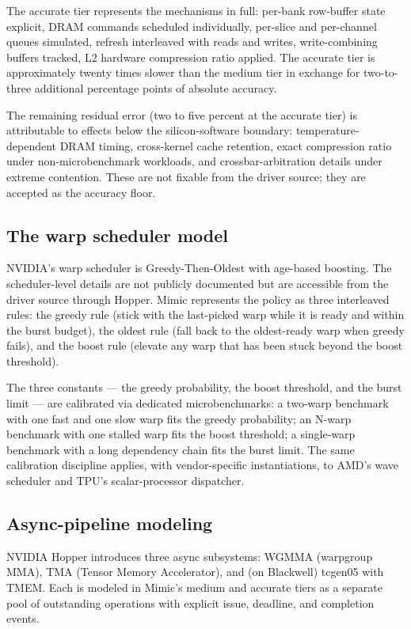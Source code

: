 The accurate tier represents the mechanisms in full: per-bank row-buffer state explicit, DRAM commands scheduled individually, per-slice and per-channel queues simulated, refresh interleaved with reads and writes, write-combining buffers tracked, L2 hardware compression ratio applied.
The accurate tier is approximately twenty times slower than the medium tier in exchange for two-to-three additional percentage points of absolute accuracy.

The remaining residual error (two to five percent at the accurate tier) is attributable to effects below the silicon-software boundary: temperature-dependent DRAM timing, cross-kernel cache retention, exact compression ratio under non-microbenchmark workloads, and crossbar-arbitration details under extreme contention.
These are not fixable from the driver source; they are accepted as the accuracy floor.

\subsection{The warp scheduler model}
\label{sec:mimic-warp-scheduler}

NVIDIA's warp scheduler is Greedy-Then-Oldest with age-based boosting.
The scheduler-level details are not publicly documented but are accessible from the driver source through Hopper.
Mimic represents the policy as three interleaved rules: the greedy rule (stick with the last-picked warp while it is ready and within the burst budget), the oldest rule (fall back to the oldest-ready warp when greedy fails), and the boost rule (elevate any warp that has been stuck beyond the boost threshold).

The three constants --- the greedy probability, the boost threshold, and the burst limit --- are calibrated via dedicated microbenchmarks: a two-warp benchmark with one fast and one slow warp fits the greedy probability; an N-warp benchmark with one stalled warp fits the boost threshold; a single-warp benchmark with a long dependency chain fits the burst limit.
The same calibration discipline applies, with vendor-specific instantiations, to AMD's wave scheduler and TPU's scalar-processor dispatcher.

\subsection{Async-pipeline modeling}
\label{sec:mimic-async}

NVIDIA Hopper introduces three async subsystems: WGMMA (warpgroup MMA), TMA (Tensor Memory Accelerator), and (on Blackwell) tcgen05 with TMEM.
Each is modeled in Mimic's medium and accurate tiers as a separate pool of outstanding operations with explicit issue, deadline, and completion events.

